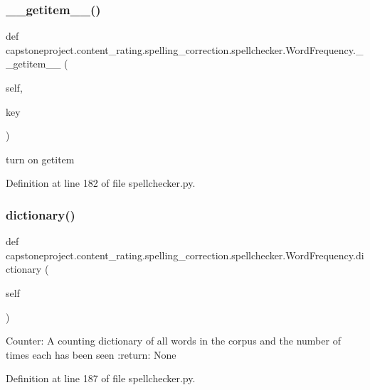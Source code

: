 \subsubsection{\texorpdfstring{\+\_\+\+\_\+getitem\+\_\+\+\_\+()}{\_\_getitem\_\_()}}
{\footnotesize\ttfamily def capstoneproject.\+content\+\_\+rating.\+spelling\+\_\+correction.\+spellchecker.\+Word\+Frequency.\+\_\+\+\_\+getitem\+\_\+\+\_\+ (\begin{DoxyParamCaption}\item[{}]{self,  }\item[{}]{key }\end{DoxyParamCaption})}

\begin{DoxyVerb}turn on getitem \end{DoxyVerb}
 

Definition at line 182 of file spellchecker.\+py.

\mbox{\label{classcapstoneproject_1_1content__rating_1_1spelling__correction_1_1spellchecker_1_1_word_frequency_a4827ddddc40fdcb5078175b3414f51d3}} 
\subsubsection{\texorpdfstring{dictionary()}{dictionary()}}
{\footnotesize\ttfamily def capstoneproject.\+content\+\_\+rating.\+spelling\+\_\+correction.\+spellchecker.\+Word\+Frequency.\+dictionary (\begin{DoxyParamCaption}\item[{}]{self }\end{DoxyParamCaption})}

\begin{DoxyVerb}Counter: A counting dictionary of all words in the corpus and the number of times each has been seen
:return: None
\end{DoxyVerb}
 

Definition at line 187 of file spellchecker.\+py.

